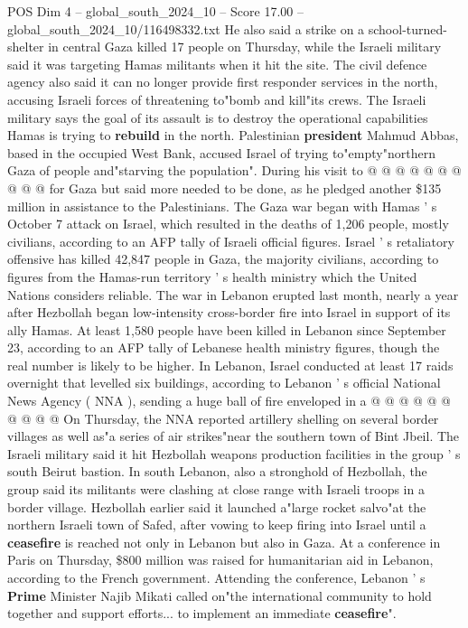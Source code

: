 \begin{textsample}{POS Dim 4 – global\_south\_2024\_10 – Score 17.00 – global\_south\_2024\_10/116498332.txt}
He also said a strike on a school-turned-shelter in central Gaza killed 17 people on Thursday, while the Israeli military said it was targeting Hamas militants when it hit the site.
The civil defence agency also said it can no longer provide first responder services in the north, accusing Israeli forces of threatening to"bomb and kill"its crews.
The Israeli military says the goal of its assault is to destroy the operational capabilities Hamas is trying to \textbf{rebuild} in the north.
Palestinian \textbf{president} Mahmud Abbas, based in the occupied West Bank, accused Israel of trying to"empty"northern Gaza of people and"starving the population".
During his visit to @ @ @ @ @ @ @ @ @ @ for Gaza but said more needed to be done, as he pledged another \$135 million in assistance to the Palestinians.
The Gaza war began with Hamas ' s October 7 attack on Israel, which resulted in the deaths of 1,206 people, mostly civilians, according to an AFP tally of Israeli official figures.
Israel ' s retaliatory offensive has killed 42,847 people in Gaza, the majority civilians, according to figures from the Hamas-run territory ' s health ministry which the United Nations considers reliable.
The war in Lebanon erupted last month, nearly a year after Hezbollah began low-intensity cross-border fire into Israel in support of its ally Hamas.
At least 1,580 people have been killed in Lebanon since September 23, according to an AFP tally of Lebanese health ministry figures, though the real number is likely to be higher.
In Lebanon, Israel conducted at least 17 raids overnight that levelled six buildings, according to Lebanon ' s official National News Agency ( NNA ), sending a huge ball of fire enveloped in a @ @ @ @ @ @ @ @ @ @ On Thursday, the NNA reported artillery shelling on several border villages as well as"a series of air strikes"near the southern town of Bint Jbeil.
The Israeli military said it hit Hezbollah weapons production facilities in the group ' s south Beirut bastion.
In south Lebanon, also a stronghold of Hezbollah, the group said its militants were clashing at close range with Israeli troops in a border village.
Hezbollah earlier said it launched a"large rocket salvo"at the northern Israeli town of Safed, after vowing to keep firing into Israel until a \textbf{ceasefire} is reached not only in Lebanon but also in Gaza.
At a conference in Paris on Thursday, \$800 million was raised for humanitarian aid in Lebanon, according to the French government.
Attending the conference, Lebanon ' s \textbf{Prime} Minister Najib Mikati called on"the international community to hold together and support efforts... to implement an immediate \textbf{ceasefire}".

\end{textsample}
